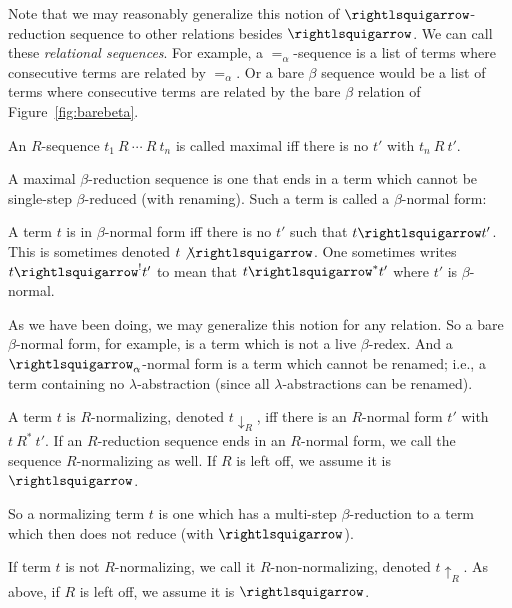 Note that we may reasonably generalize this notion of
$\betaa$-reduction sequence to other relations besides
$\betaa$.  We can call these \emph{relational sequences}.  For
example, a $=_\alpha$-sequence is a list of terms where consecutive
terms are related by $=_\alpha$. Or a bare $\beta$ sequence would
be a list of terms where consecutive terms are related by the bare $\beta$
relation of Figure~\ref{fig:barebeta}.

\begin{definition}
  An $R$-sequence $t_1\ R \ \cdots\ R\ t_n$ is called maximal iff
  there is no $t'$ with $t_n\ R \ t'$.
  \end{definition}

A maximal $\beta$-reduction sequence is one that ends in a term
which cannot be single-step $\beta$-reduced (with renaming).  Such
a term is called a $\beta$-normal form:

\begin{definition}
\label{def:betanf}
  A term $t$ is in $\beta$-normal form iff there is no $t'$ such
  that $t\betaa t'$.  This is sometimes denoted $t \not\betaa$.
  One sometimes writes $t\betaa^! t'$ to mean
  that $t\betaa^*t'$ where $t'$ is $\beta$-normal.
\end{definition}

As we have been doing, we may generalize this notion for any relation.
So a bare $\beta$-normal form, for example, is a term which is not a
live $\beta$-redex.  And a $\curva_\alpha$-normal form is a term which
cannot be renamed; i.e., a term containing no $\lambda$-abstraction
(since all $\lambda$-abstractions can be renamed).

\begin{definition}[normalizing]
\label{def:normalizing}
  A term $t$ is $R$-normalizing, denoted $t \downarrow_R$, iff there is an $R$-normal form $t'$ with $t\ R^*\ t'$.
  If an $R$-reduction sequence ends in an $R$-normal form, we call the sequence $R$-normalizing as well.
  If $R$ is left off, we assume it is $\betaa$.
\end{definition}

So a normalizing term $t$ is one which has a multi-step $\beta$-reduction to a term
which then does not reduce (with $\betaa$).  

\begin{definition}
\label{def:nonnorm}
  If term $t$ is not $R$-normalizing, we call it $R$-non-normalizing, denoted $t \uparrow_R$.
  As above, if $R$ is left off, we assume it is $\betaa$.
\end{definition}

